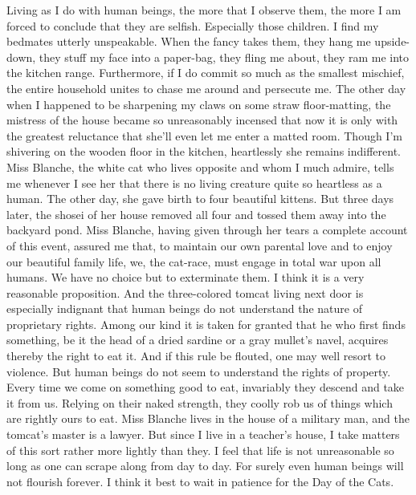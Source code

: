\documentclass{book}
\begin{document}
Living as I do with human beings, the more that I observe them, the more
I am forced to conclude that they are selfish. Especially those
children. I find my bedmates utterly unspeakable. When the fancy takes
them, they hang me upside-down, they stuff my face into a paper-bag,
they fling me about, they ram me into the kitchen range. Furthermore, if
I do commit so much as the smallest mischief, the entire household
unites to chase me around and persecute me. The other day when I
happened to be sharpening my claws on some straw floor-matting, the
mistress of the house became so unreasonably incensed that now it is
only with the greatest reluctance that she'll even let me enter a matted
room. Though I'm shivering on the wooden floor in the kitchen,
heartlessly she remains indifferent. Miss Blanche, the white cat who
lives opposite and whom I much admire, tells me whenever I see her that
there is no living creature quite so heartless as a human. The other
day, she gave birth to four beautiful kittens. But three days later, the
shosei of her house removed all four and tossed them away into the
backyard pond. Miss Blanche, having given through her tears a complete
account of this event, assured me that, to maintain our own parental
love and to enjoy our beautiful family life, we, the cat-race, must
engage in total war upon all humans. We have no choice but to
exterminate them. I think it is a very reasonable proposition. And the
three-colored tomcat living next door is especially indignant that human
beings do not understand the nature of proprietary rights. Among our
kind it is taken for granted that he who first finds something, be it
the head of a dried sardine or a gray mullet's navel, acquires thereby
the right to eat it. And if this rule be flouted, one may well resort to
violence. But human beings do not seem to understand the rights of
property. Every time we come on something good to eat, invariably they
descend and take it from us. Relying on their naked strength, they
coolly rob us of things which are rightly ours to eat. Miss Blanche
lives in the house of a military man, and the tomcat's master is a
lawyer. But since I live in a teacher's house, I take matters of this
sort rather more lightly than they. I feel that life is not unreasonable
so long as one can scrape along from day to day. For surely even human
beings will not flourish forever. I think it best to wait in patience
for the Day of the Cats.
\end{document}
